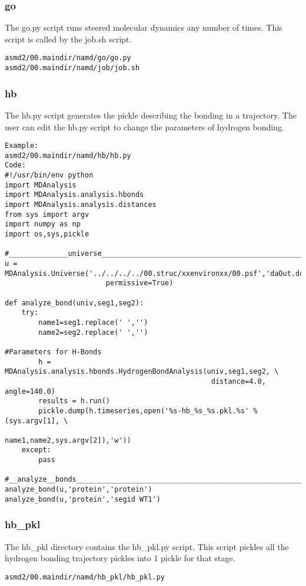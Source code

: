 \documentclass[11pt]{article}
\begin{document}
\subsubsection{go}
The go.py script runs steered molecular dynamics any number of times. This script is called by the job.sh script.
\begin{verbatim}
asmd2/00.maindir/namd/go/go.py
asmd2/00.maindir/namd/job/job.sh
\end{verbatim}
\subsubsection{hb}
The hb.py script generates the pickle describing the bonding in a trajectory. The user can edit the hb.py script to change the parameters of hydrogen bonding.
\begin{verbatim}
Example:
asmd2/00.maindir/namd/hb/hb.py
Code:
#!/usr/bin/env python
import MDAnalysis
import MDAnalysis.analysis.hbonds
import MDAnalysis.analysis.distances
from sys import argv
import numpy as np
import os,sys,pickle

#______________universe________________________________________________________
u = MDAnalysis.Universe('../../../../00.struc/xxenvironxx/00.psf','daOut.dcd',\
                        permissive=True)

def analyze_bond(univ,seg1,seg2):
    try:
        name1=seg1.replace(' ','')
        name2=seg2.replace(' ','')
 
#Parameters for H-Bonds
        h = MDAnalysis.analysis.hbonds.HydrogenBondAnalysis(univ,seg1,seg2, \
                                                 distance=4.0, angle=140.0)     
        results = h.run()
        pickle.dump(h.timeseries,open('%s-hb_%s_%s.pkl.%s' % (sys.argv[1], \
                                              name1,name2,sys.argv[2]),'w'))
    except:
        pass

#__analyze__bonds______________________________________________________________
analyze_bond(u,'protein','protein')
analyze_bond(u,'protein','segid WT1')
\end{verbatim}

\subsubsection{hb\_pkl}
The hb\_pkl directory contains the hb\_pkl.py script. This script pickles all the hydrogen bonding trajectory pickles into 1 pickle for that stage.
\begin{verbatim}
asmd2/00.maindir/namd/hb_pkl/hb_pkl.py
\end{verbatim}
\end{document}

